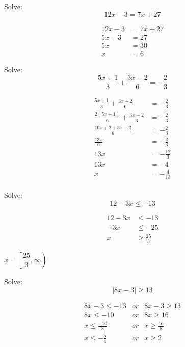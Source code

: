 \documentclass[fleqn,addpoints]{exam}
\begin{document}
\begin{questions}
\question 
Solve:
\[ 
  12x - 3 = 7x+ 27 
\]

\begin{solution}
\begin{align*}
  12x - 3 &= 7x+ 27 \\
  5x - 3 &= 27 \\
  5x  &= 30 \\
  x &= 6
\end{align*}
\end{solution}

\question
Solve:
\[ 
  \frac{5x + 1}{3} + \frac{3x - 2}{6} = -\frac{2}{3} 
\]

\begin{solution}
\begin{align*}
  \frac{5x + 1}{3} + \frac{3x - 2}{6} &= -\frac{2}{3} \\
  \frac{2(5x + 1)}{6} + \frac{3x - 2}{6} &= -\frac{2}{3} \\
  \frac{10x + 2 + 3x - 2}{6} &= -\frac{2}{3} \\
  \frac{13x}{6} &= -\frac{2}{3} \\
  13x &= -\frac{12}{3} \\
  13x &= -4 \\
  x &= - \frac{4}{13} \\
\end{align*}

\end{solution}

\question
Solve:
\[ 
  12 - 3x \leq -13 
\]

\begin{solution}
\begin{align*}
  12 - 3x &\leq -13 \\
  -3x &\leq -25 \\
  x &\geq \frac{25}{3}
\end{align*}

$x = \left [ \dfrac{25}{3}, \infty \right) $

\end{solution}

\question
Solve:
\[ 
  |8x-3| \geq 13  
\]

\begin{solution}
\begin{eqnarray*}
  8x-3 \leq -13 & or & 8x-3 \geq 13 \\
  8x \leq -10 & or & 8x \geq 16 \\
  x \leq \frac{-10}{8} & or & x \geq \frac{16}{8} \\
  x \leq - \frac{5}{4} & or & x \geq 2 \\
\end{eqnarray*}


\end{solution}
\end{questions}
\end{document}
